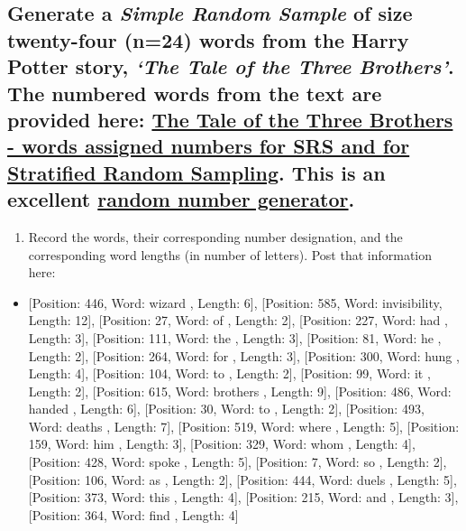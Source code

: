 \documentclass[letterpaper]{article}
\def\tightlist{}
\begin{document}
\subsection{\texorpdfstring{Generate a \textbf{\emph{Simple Random Sample}} of size twenty-four (n=24) words from the Harry Potter story, \emph{`The Tale of the Three Brothers'}. The numbered words from the text are provided here: \href{https://docs.google.com/spreadsheets/d/1BMHsKkGDRVfLbewaZK6BFXN65DYBqygb5qfAAnAiH4o/edit\#gid=330838861}{The Tale of the Three Brothers - words assigned numbers for SRS and for Stratified Random Sampling}. This is an excellent \href{https://istats.shinyapps.io/RandomNumbers/}{random number generator}.}{Generate a Simple Random Sample of size twenty-four (n=24) words from the Harry Potter story, `The Tale of the Three Brothers'. The numbered words from the text are provided here: The Tale of the Three Brothers - words assigned numbers for SRS and for Stratified Random Sampling. This is an excellent random number generator.}}\label{generate-a-simple-random-sample-of-size-twenty-four-n24-words-from-the-harry-potter-story-the-tale-of-the-three-brothers.-the-numbered-words-from-the-text-are-provided-here-the-tale-of-the-three-brothers---words-assigned-numbers-for-srs-and-for-stratified-random-sampling.-this-is-an-excellent-random-number-generator.}

\begin{enumerate}
\def\labelenumi{\alph{enumi}.}
\tightlist
\item
  Record the words, their corresponding number designation, and the corresponding word lengths (in number of letters). Post that information here:\\
\end{enumerate}

\begin{itemize}
\tightlist
\item
  {[}Position: 446, Word: wizard , Length: 6{]},
  {[}Position: 585, Word: invisibility, Length: 12{]},
  {[}Position: 27, Word: of , Length: 2{]},
  {[}Position: 227, Word: had , Length: 3{]},
  {[}Position: 111, Word: the , Length: 3{]},
  {[}Position: 81, Word: he , Length: 2{]},
  {[}Position: 264, Word: for , Length: 3{]},
  {[}Position: 300, Word: hung , Length: 4{]},
  {[}Position: 104, Word: to , Length: 2{]},
  {[}Position: 99, Word: it , Length: 2{]},
  {[}Position: 615, Word: brother\textquotesingle s , Length: 9{]},
  {[}Position: 486, Word: handed , Length: 6{]},
  {[}Position: 30, Word: to , Length: 2{]},
  {[}Position: 493, Word: death\textquotesingle s , Length: 7{]},
  {[}Position: 519, Word: where , Length: 5{]},
  {[}Position: 159, Word: him , Length: 3{]},
  {[}Position: 329, Word: whom , Length: 4{]},
  {[}Position: 428, Word: spoke , Length: 5{]},
  {[}Position: 7, Word: so , Length: 2{]},
  {[}Position: 106, Word: as , Length: 2{]},
  {[}Position: 444, Word: duels , Length: 5{]},
  {[}Position: 373, Word: this , Length: 4{]},
  {[}Position: 215, Word: and , Length: 3{]},
  {[}Position: 364, Word: find , Length: 4{]}
\end{itemize}
\end{document}
